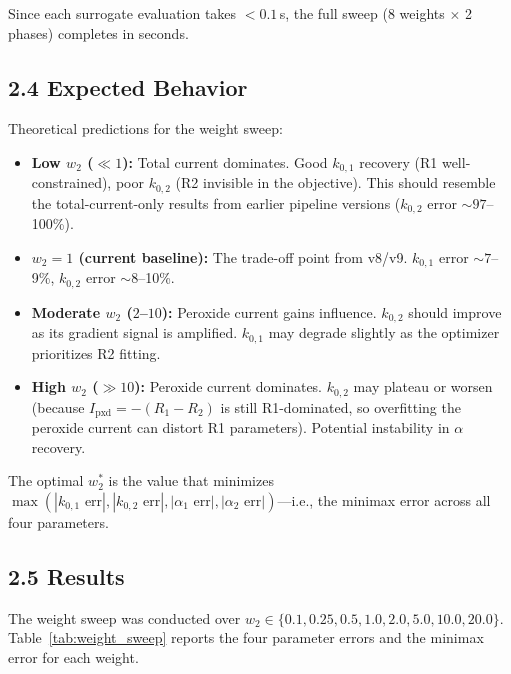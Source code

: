 \documentclass[11pt]{article}
\begin{document}
Since each surrogate evaluation takes $< 0.1$\,s, the full sweep
(8 weights $\times$ 2 phases) completes in seconds.

\subsection*{2.4 Expected Behavior}

Theoretical predictions for the weight sweep:
\begin{itemize}
  \item \textbf{Low $w_2$ ($\ll 1$):} Total current dominates.  Good $k_{0,1}$
        recovery (R1 well-constrained), poor $k_{0,2}$ (R2 invisible in the
        objective).  This should resemble the total-current-only results from
        earlier pipeline versions ($k_{0,2}$ error ${\sim}97$--100\%).

  \item \textbf{$w_2 = 1$ (current baseline):} The trade-off point from v8/v9.
        $k_{0,1}$ error ${\sim}7$--9\%, $k_{0,2}$ error ${\sim}8$--10\%.

  \item \textbf{Moderate $w_2$ ($2$--$10$):} Peroxide current gains influence.
        $k_{0,2}$ should improve as its gradient signal is amplified.
        $k_{0,1}$ may degrade slightly as the optimizer prioritizes R2 fitting.

  \item \textbf{High $w_2$ ($\gg 10$):} Peroxide current dominates.  $k_{0,2}$
        may plateau or worsen (because $I_{\text{pxd}} = -(R_1 - R_2)$ is still
        R1-dominated, so overfitting the peroxide current can distort R1 parameters).
        Potential instability in $\alpha$ recovery.
\end{itemize}

The optimal $w_2^*$ is the value that minimizes $\max(|k_{0,1}\text{ err}|,
|k_{0,2}\text{ err}|, |\alpha_1\text{ err}|, |\alpha_2\text{ err}|)$---i.e.,
the minimax error across all four parameters.

\subsection*{2.5 Results}

The weight sweep was conducted over $w_2 \in \{0.1, 0.25, 0.5, 1.0, 2.0, 5.0,
10.0, 20.0\}$.  Table~\ref{tab:weight_sweep} reports the four parameter errors
and the minimax error for each weight.
\end{document}
